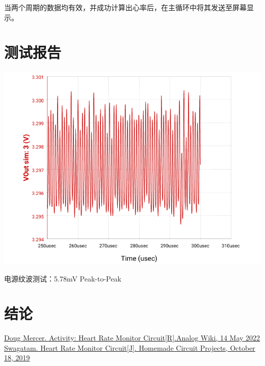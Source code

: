 \documentclass[a4paper]{ctexart}
\begin{document}
	当两个周期的数据均有效，并成功计算出心率后，在主循环中将其发送至屏幕显示。

\newpage
\section{测试报告}
\begin{cent-powerpeak-test}
	\centering
	\includegraphics[width=1.0\textwidth]{amCharts.png}
	\caption{电源纹波测试：5.78mV Peak-to-Peak}
\end{cent-powerpeak-test}


\newpage
\section{结论}

\newpage
\begin{thebibliography}{20}
	\href{https://wiki.analog.com/university/courses/alm1k/alm-lab-heart-rate-mon}{Doug Mercer. Activity: Heart Rate Monitor Circuit[R].Analog Wiki, 14 May 2022}
	\href{https://www.homemade-circuits.com/heart-rate-monitor-alarm-circuit/}{Swagatam. Heart Rate Monitor Circuit[J]. Homemade Circuit Projects, October 18, 2019}
\end{thebibliography}
\end{document}
